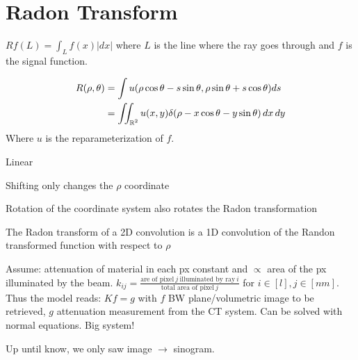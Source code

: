 \section{Radon Transform}

\begin{definition}
  \(Rf(L) = \int_L f(x) |dx|\) where \(L\) is the line where the ray goes through and \(f\) is the signal function.
\end{definition}

\begin{definition}
  \begin{align*}
    R(\rho, \theta) & = \int u(\rho \cos \theta - s \sin \theta, \rho \sin \theta + s \cos \theta) ds \\
    & = \iint_{\operatorname{\mathbb{R}}^2} u(x, y) \delta(\rho - x \cos \theta -y \sin \theta) \,dx \,dy
  \end{align*}
  Where \(u\) is the reparameterization of \(f\).
\end{definition}

\begin{definition}[Properties]
  \begin{itemize*}
    \item Linear
    \item Shifting only changes the \(\rho\) coordinate
    \item Rotation of the coordinate system also rotates the Radon transformation
    \item The Radon transform of a 2D convolution is a 1D convolution of the Randon transformed function with respect to \(\rho\)
  \end{itemize*}
\end{definition}

\begin{algorithm}
  Assume: attenuation of material in each px constant and \(\propto\) area of the px illuminated by the beam.
  \(k_{ij} = \frac{\text{are of pixel} \ j \ \text{illuminated by ray} \ i}{\text{total area of pixel} \ j}\) for \(i \in [l], j \in [nm]\). Thus the model reads:
  \(Kf = g\) with \(f\) BW plane/volumetric image to be retrieved, \(g\) attenuation measurement from the CT system. Can be solved with normal equations. Big system!
\end{algorithm}

\begin{theorem}
  Up until know, we only saw image \(\to\) sinogram.
\end{theorem}

